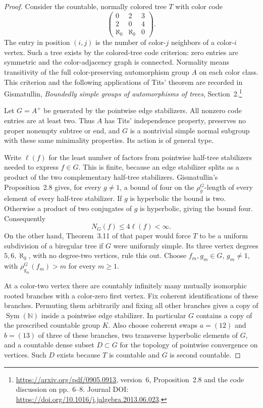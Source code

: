 \begin{proof}
Consider the countable, normally colored tree $T$ with color code
\[
 \begin{pmatrix}
 0&2&3\\
 2&0&4\\
 \aleph_0&\aleph_0&0
 \end{pmatrix}.
\]
The entry in position $(i,j)$ is the number of color-$j$ neighbors
of a color-$i$ vertex.  Such a tree exists by the colored-tree code
criterion: zero entries are symmetric and the color-adjacency graph
is connected.  Normality means transitivity of the full
color-preserving automorphism group $A$ on each color class.  This
criterion and the following applications of Tits' theorem are recorded
in Gismatullin, \emph{Boundedly simple groups of automorphisms of trees},
Section~2.\footnote{\url{https://arxiv.org/pdf/0905.0913}, version~6,
Proposition~2.8 and the code discussion on pp.~6--8.  Journal DOI:
\url{https://doi.org/10.1016/j.jalgebra.2013.06.023}.}

Let $G=A^+$ be generated by the pointwise edge stabilizers.  All
nonzero code entries are at least two.  Thus $A$ has Tits'
independence property, preserves no proper nonempty subtree or end,
and $G$ is a nontrivial simple normal subgroup with these same
minimality properties.  Its action is of general type.

Write $\ell(f)$ for the least number of factors from pointwise
half-tree stabilizers needed to express $f\in G$.  This is finite,
because an edge stabilizer splits as a product of the two
complementary half-tree stabilizers.  Gismatullin's Proposition~2.8
gives, for every $g\ne1$, a bound of four on the $\rho_g^G$-length
of every element of every half-tree stabilizer.  If $g$ is
hyperbolic the bound is two.  Otherwise a product of two conjugates
of $g$ is hyperbolic, giving the bound four.  Consequently
\begin{equation}\label{eq:tree-pointwise-bound}
 N_G(f)\leq4\ell(f)<\infty.
\end{equation}
On the other hand, Theorem~3.11 of that paper would force $T$ to be
a uniform subdivision of a biregular tree if $G$ were uniformly
simple.  Its three vertex degrees $5,6,\aleph_0$, with no degree-two
vertices, rule this out.  Choose $f_m,g_m\in G$, $g_m\ne1$, with
$\rho_{g_m}^G(f_m)>m$ for every $m\geq1$.

At a color-two vertex there are countably infinitely many mutually
isomorphic rooted branches with a color-zero first vertex.  Fix
coherent identifications of these branches.  Permuting them
arbitrarily and fixing all other branches gives a copy of
$\operatorname{Sym}(\mathbb N)$ inside a pointwise edge stabilizer.
In particular $G$ contains a copy of the prescribed countable group
$K$.  Also choose coherent swaps $a=(12)$ and $b=(13)$ of three of
these branches, two transverse hyperbolic elements of $G$, and a
countable dense subset $D\subset G$ for the topology of pointwise
convergence on vertices.  Such $D$ exists because $T$ is countable
and $G$ is second countable.


\end{proof}
